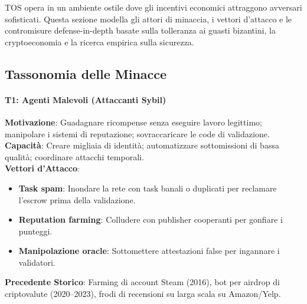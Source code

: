 \documentclass[11pt]{article}
\begin{document}
\begin{itemize}[noitemsep]
TOS opera in un ambiente ostile dove gli incentivi economici attraggono avversari sofisticati. Questa sezione modella gli attori di minaccia, i vettori d'attacco e le contromisure defense-in-depth basate sulla tolleranza ai guasti bizantini, la cryptoeconomia e la ricerca empirica sulla sicurezza.

\subsection{Tassonomia delle Minacce}

\paragraph{T1: Agenti Malevoli (Attaccanti Sybil)}
\textbf{Motivazione}: Guadagnare ricompense senza eseguire lavoro legittimo; manipolare i sistemi di reputazione; sovraccaricare le code di validazione.\\
\textbf{Capacità}: Creare migliaia di identità; automatizzare sottomissioni di bassa qualità; coordinare attacchi temporali.\\
\textbf{Vettori d'Attacco}:
\begin{itemize}[noitemsep]
  \item \textbf{Task spam}: Inondare la rete con task banali o duplicati per reclamare l'escrow prima della validazione.
  \item \textbf{Reputation farming}: Colludere con publisher cooperanti per gonfiare i punteggi.
  \item \textbf{Manipolazione oracle}: Sottomettere attestazioni false per ingannare i validatori.
\end{itemize}
\textbf{Precedente Storico}: Farming di account Steam (2016), bot per airdrop di criptovalute (2020--2023), frodi di recensioni su larga scala su Amazon/Yelp.


\end{itemize}
\end{document}
